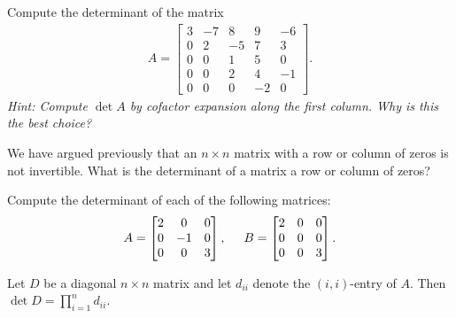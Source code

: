\documentclass[12pt,letterpaper,reqno]{article}
\numberwithin{equation}{section}
\begin{document}
\begin{exercise}
Compute the determinant of the matrix
\begin{align*}
	A=\begin{bmatrix}
		3 & -7 & 8 & 9 & -6 \\
		0 & 2 & -5 & 7 & 3 \\
		0 & 0 & 1 & 5 & 0 \\
		0 & 0 & 2 & 4 & -1 \\
		0 & 0 & 0 & -2 & 0
	\end{bmatrix}.
\end{align*}
\emph{Hint: Compute $\det A$ by cofactor expansion along the first column. Why is this the best choice?}	
\end{exercise}

\begin{exercise}
We have argued previously that an $n \times n$ matrix with a row or column of zeros is not invertible. What is the determinant of a matrix a row or column of zeros?	
\end{exercise}

\begin{exercise}
Compute the determinant of each of the following matrices:
\begin{align*}
	A=\begin{bmatrix}
		2 & 0 & 0 \\
		0 & -1 & 0 \\
		0 & 0 & 3
	\end{bmatrix}, \hspace{0.5cm} B=\begin{bmatrix}
		2 & 0 & 0 \\
		0 & 0 & 0 \\
		0 & 0 & 3
	\end{bmatrix}.
\end{align*}	
\end{exercise}

\begin{thm}\label{thm:determinant_of_a_diagonal_matrix}
	Let $D$ be a diagonal $n \times n$ matrix and let $d_{ii}$ denote the $(i,i)$-entry of $A$. Then $\det D=\prod_{i=1}^n d_{ii}$.
\end{thm}
\end{document}
